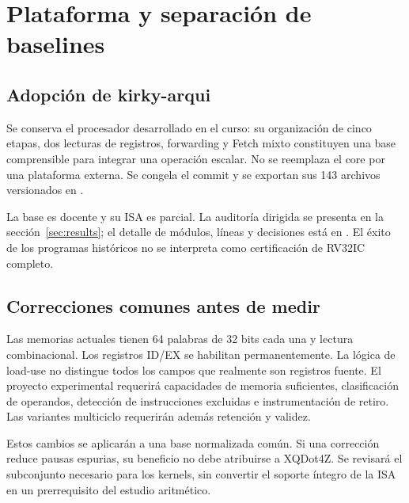 \section{Plataforma y separación de baselines}
\subsection{Adopción de kirky-arqui}
Se conserva el procesador desarrollado en el curso: su organización de cinco
etapas, dos lecturas de registros, forwarding y Fetch mixto constituyen una
base comprensible para integrar una operación escalar. No se reemplaza el
core por una plataforma externa. Se congela el commit \code{\CoreShort} y
se exportan sus 143 archivos versionados en .

La base es docente y su ISA es parcial. La auditoría dirigida se presenta en
la sección~\ref{sec:results}; el detalle de módulos, líneas y decisiones está
en . El éxito de los programas históricos no se
interpreta como certificación de RV32IC completo.

\subsection{Correcciones comunes antes de medir}
Las memorias actuales tienen 64 palabras de 32 bits cada una y lectura
combinacional. Los registros ID/EX se habilitan permanentemente. La lógica de
load-use no distingue todos los campos que realmente son registros fuente.
El proyecto experimental requerirá capacidades de memoria suficientes,
clasificación de operandos, detección de instrucciones excluidas e instrumentación
de retiro. Las variantes multiciclo requerirán además retención y validez.

Estos cambios se aplicarán a una base normalizada común. Si una corrección
reduce pausas espurias, su beneficio no debe atribuirse a XQDot4Z. Se revisará
el subconjunto necesario para los kernels, sin convertir el soporte íntegro
de la ISA en un prerrequisito del estudio aritmético.

\begin{center}
\end{center}

